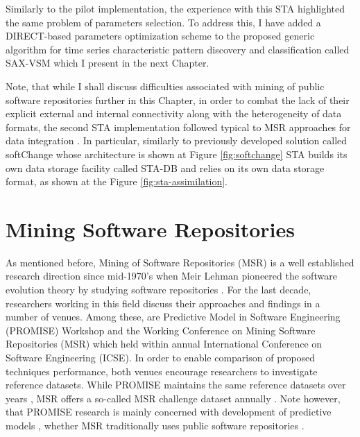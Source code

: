 Similarly to the pilot implementation, the experience with this STA highlighted the same problem of parameters selection. 
To address this, I have added a DIRECT-based parameters optimization scheme \cite{citeulike:12563460} to the proposed 
generic algorithm for time series characteristic pattern discovery and classification called SAX-VSM \cite{sax-vsm} which 
I present in the next Chapter. 

Note, that while I shall discuss difficulties associated with mining of public software repositories further in this Chapter, 
in order to combat the lack of their explicit external and internal connectivity along with the heterogeneity of data formats,
the second STA implementation followed typical to MSR approaches for data integration \cite{citeulike:13058334} \cite{cvsanaly}. 
In particular, similarly to previously developed solution called softChange \cite{german04_softchange} whose 
architecture is shown at Figure \ref{fig:softchange} STA builds its own data storage facility called STA-DB and 
relies on its own data storage format, as shown at the Figure \ref{fig:sta-assimilation}.

\section{Mining Software Repositories}
As mentioned before, Mining of Software Repositories (MSR) is a well established research direction since 
mid-1970's when Meir Lehman pioneered the software evolution theory by studying software repositories 
\cite{citeulike:2739216}. 
For the last decade, researchers working in this field discuss their approaches and findings in a number of venues. 
Among these, are Predictive Model in Software Engineering (PROMISE) Workshop and the Working Conference on Mining 
Software Repositories (MSR) which held within annual International Conference on Software Engineering (ICSE).
In order to enable comparison of proposed techniques performance, both venues encourage researchers to investigate 
reference datasets. 
While PROMISE maintains the same reference datasets over years \cite{promise12}, 
MSR offers a so-called MSR challenge dataset annually \cite{MSRChallenge2012} \cite{MSRChallenge2013}.
Note however, that {PROMISE} research is mainly concerned with development of predictive models \cite{Menzies13},
whether MSR traditionally uses public software repositories 
\cite{citeulike:12550438} \cite{citeulike:2710928} \cite{citeulike:7853299}.

